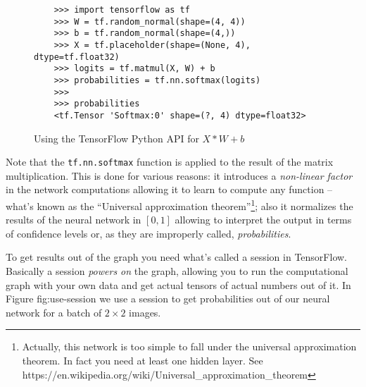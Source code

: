 \begin{figure}
  \begin{verbatim}
    >>> import tensorflow as tf
    >>> W = tf.random_normal(shape=(4, 4))
    >>> b = tf.random_normal(shape=(4,))
    >>> X = tf.placeholder(shape=(None, 4), dtype=tf.float32)
    >>> logits = tf.matmul(X, W) + b
    >>> probabilities = tf.nn.softmax(logits)
    >>>
    >>> probabilities
    <tf.Tensor 'Softmax:0' shape=(?, 4) dtype=float32>
  \end{verbatim}
  \caption{Using the TensorFlow Python API for $X * W + b$}
\end{figure}

Note that the \texttt{tf.nn.softmax} function is applied to the result of
the matrix multiplication. This is done for various reasons: it
introduces a \emph{non-linear factor} in the network computations
allowing it to learn to compute any function -- what's known as the
``Universal approximation theorem''\footnote{Actually, this network is
too simple to fall under the universal approximation theorem. In fact
you need at least one hidden layer. See
https://en.wikipedia.org/wiki/Universal\_approximation\_theorem}; also
it normalizes the results of the neural network in $[0,1]$ allowing to
interpret the output in terms of confidence levels or, as they are
improperly called, \emph{probabilities}.

To get results out of the graph you need what's called a session in
TensorFlow. Basically a session \emph{powers on} the graph, allowing
you to run the computational graph with your own data and get actual
tensors of actual numbers out of it. In Figure {fig:use-session} we use a
session to get probabilities out of our neural network for a batch of
\( 2 \times 2 \) images.


